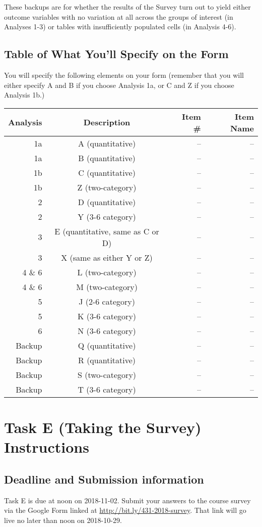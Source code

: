 \documentclass[]{book}
\theoremstyle{definition}
\theoremstyle{definition}
\theoremstyle{definition}
\theoremstyle{remark}
\begin{document}
These backups are for whether the results of the Survey turn out to
yield either outcome variables with no variation at all across the
groups of interest (in Analyses 1-3) or tables with insufficiently
populated cells (in Analysis 4-6).

\hypertarget{table-of-what-youll-specify-on-the-form}{%
\section{Table of What You'll Specify on the
Form}\label{table-of-what-youll-specify-on-the-form}}

You will specify the following elements on your form (remember that you
will either specify A and B if you choose Analysis 1a, or C and Z if you
choose Analysis 1b.)

\begin{longtable}[]{@{}rcrr@{}}
\toprule
Analysis & Description & Item \# & Item Name\tabularnewline
\midrule
\endhead
1a & A (quantitative) & -- & --\tabularnewline
1a & B (quantitative) & -- & --\tabularnewline
1b & C (quantitative) & -- & --\tabularnewline
1b & Z (two-category) & -- & --\tabularnewline
2 & D (quantitative) & -- & --\tabularnewline
2 & Y (3-6 category) & -- & --\tabularnewline
3 & E (quantitative, same as C or D) & -- & --\tabularnewline
3 & X (same as either Y or Z) & -- & --\tabularnewline
4 \& 6 & L (two-category) & -- & --\tabularnewline
4 \& 6 & M (two-category) & -- & --\tabularnewline
5 & J (2-6 category) & -- & --\tabularnewline
5 & K (3-6 category) & -- & --\tabularnewline
6 & N (3-6 category) & -- & --\tabularnewline
Backup & Q (quantitative) & -- & --\tabularnewline
Backup & R (quantitative) & -- & --\tabularnewline
Backup & S (two-category) & -- & --\tabularnewline
Backup & T (3-6 category) & -- & --\tabularnewline
\bottomrule
\end{longtable}

\hypertarget{taskE}{%
\chapter{Task E (Taking the Survey) Instructions}\label{taskE}}

\hypertarget{deadline-and-submission-information-4}{%
\section{Deadline and Submission
information}\label{deadline-and-submission-information-4}}

Task E is due at noon on 2018-11-02. Submit your answers to the course
survey via the Google Form linked at
\url{http://bit.ly/431-2018-survey}. That link will go live no later
than noon on 2018-10-29.
\end{document}
